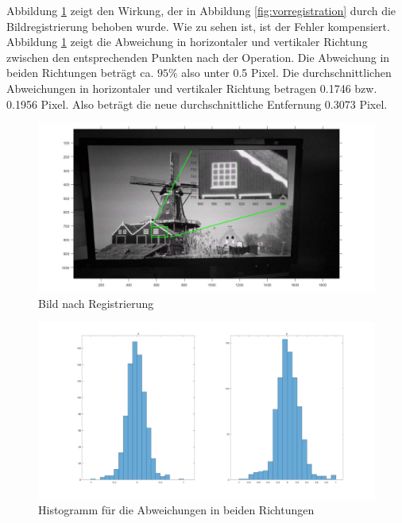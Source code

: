 Abbildung \ref{fig:Bild nach Registration} zeigt den Wirkung, der in Abbildung \ref{fig:vorregistration} durch die Bildregistrierung behoben wurde. Wie zu sehen ist, ist der Fehler kompensiert. Abbildung \ref{fig:Bild nach Registration} zeigt die Abweichung in horizontaler und vertikaler Richtung zwischen den entsprechenden Punkten nach der Operation. Die Abweichung in beiden Richtungen beträgt ca. $ 95\% $  also unter 0.5 Pixel. Die durchschnittlichen Abweichungen in horizontaler und vertikaler Richtung betragen 0.1746 bzw. 0.1956 Pixel. Also beträgt die neue durchschnittliche Entfernung 0.3073 Pixel. 

\begin{figure}[H]
 \centering 
  \includegraphics[keepaspectratio,width=1.00\textwidth]{images/5_Implementirung/nachregis.pdf}
 \caption{Bild nach Registrierung}
 \label{fig:Bild nach Registration}
\end{figure}


\begin{figure}[H]
 \centering 
  \includegraphics[keepaspectratio,width=1.0\textwidth]{images/6_Auswertung/histogramregistration1_8.pdf}
 \caption{Histogramm für die Abweichungen in beiden Richtungen}
 \label{fig:Histogrammfr}
\end{figure}

